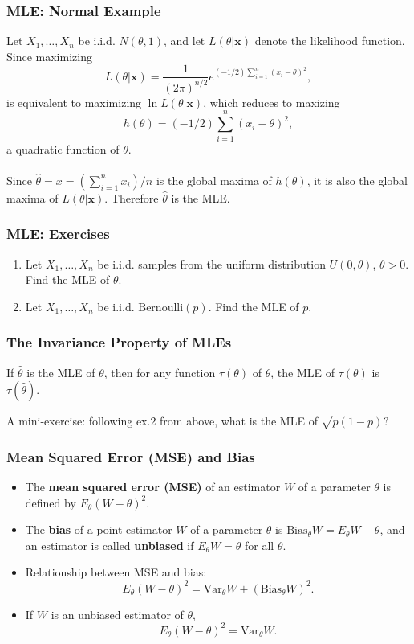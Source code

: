 \documentclass{beamer}
\begin{document}
\begin{frame}
\frametitle{MLE: Normal Example}
Let $X_1,\ldots,X_n$ be i.i.d. $N(\theta,1)$, and let $L(\theta|\mathbf{x})$ denote the likelihood function. Since maximizing
$$
L(\theta|\mathbf{x}) = \frac{1}{(2\pi)^{n/2}}e^{(-1/2)\sum_{i=1}^n(x_i-\theta)^2},
$$
is equivalent to maximizing $\ln L(\theta|\mathbf{x})$, which reduces to maxizing 
$$
h(\theta)=(-1/2)\sum_{i=1}^n(x_i-\theta)^2,
$$
a quadratic function of $\theta$.
\\~\\
Since $\hat{\theta}=\bar{x}=(\sum_{i=1}^n x_i)/n$ is the global maxima of $h(\theta)$, it is also the global maxima of $L(\theta|\mathbf{x})$. Therefore $\hat{\theta}$ is the MLE.
\end{frame}

\begin{frame}
\frametitle{MLE: Exercises}
\begin{enumerate}
\item Let $X_1,\ldots,X_n$ be i.i.d. samples from the uniform distribution $U(0,\theta)$, $\theta > 0$. Find the MLE of $\theta$.
\vspace*{1in}
\item Let $X_1,\ldots,X_n$ be i.i.d. $\text{Bernoulli}(p)$. Find the MLE of $p$.
\vspace*{1in}
\end{enumerate}
\end{frame}

\begin{frame}
\frametitle{The Invariance Property of MLEs}
\begin{theorem}
If $\hat{\theta}$ is the MLE of $\theta$, then for any function $\tau(\theta)$ of $\theta$, the MLE of $\tau(\theta)$ is $\tau(\hat{\theta})$.
\end{theorem}

\vspace*{0.7in}
A mini-exercise: following ex.2 from above, what is the MLE of $\sqrt{p(1-p)}$?
\end{frame}

\begin{frame}
\frametitle{Mean Squared Error (MSE) and Bias}
\begin{itemize}
\item The \textbf{mean squared error (MSE)} of an estimator $W$ of a parameter $\theta$ is defined by $E_{\theta}(W-\theta)^2$.
\item The \textbf{bias} of a point estimator $W$ of a parameter $\theta$ is $\text{Bias}_{\theta}W=E_{\theta}W-\theta$, and an estimator is called \textbf{unbiased} if $E_{\theta}W=\theta$ for all $\theta$.
\item Relationship between MSE and bias:
$$
E_{\theta}(W-\theta)^2 = \text{Var}_{\theta}W + (\text{Bias}_{\theta}W)^2.
$$
\item If $W$ is an unbiased estimator of $\theta$,
$$
E_{\theta}(W-\theta)^2 = \text{Var}_{\theta}W.
$$
\end{itemize}
\end{frame}
\end{document}
